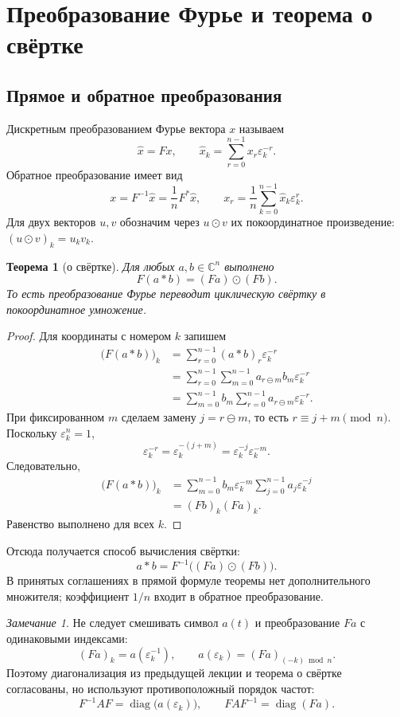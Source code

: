 \documentclass[12pt,a4paper]{article}
\newtheorem{theorem}{Теорема}
\theoremstyle{definition}
\theoremstyle{remark}
\newtheorem*{remark}{Замечание}
\DeclareMathOperator{\diag}{diag}
\newcommand{\CC}{\mathbb{C}}
\newcommand{\eps}{\varepsilon}
\begin{document}
\section{Преобразование Фурье и теорема о свёртке}

\subsection{Прямое и обратное преобразования}

Дискретным преобразованием Фурье вектора $x$ называем
\[
  \widehat x=Fx,\qquad
  \widehat x_k=\sum_{r=0}^{n-1}x_r\eps_k^{-r}.
\]
Обратное преобразование имеет вид
\[
  x=F^{-1}\widehat x=\frac1nF^*\widehat x,\qquad
  x_r=\frac1n\sum_{k=0}^{n-1}\widehat x_k\eps_k^r.
\]
Для двух векторов $u,v$ обозначим через $u\odot v$ их покоординатное
произведение: $(u\odot v)_k=u_kv_k$.

\begin{theorem}[о свёртке]
Для любых $a,b\in\CC^n$ выполнено
\[
  \boxed{F(a*b)=(Fa)\odot(Fb)}.
\]
То есть преобразование Фурье переводит циклическую свёртку в
покоординатное умножение.
\end{theorem}

\begin{proof}
Для координаты с номером $k$ запишем
\begin{align*}
  \bigl(F(a*b)\bigr)_k
  &=\sum_{r=0}^{n-1}(a*b)_r\eps_k^{-r}\\
  &=\sum_{r=0}^{n-1}\sum_{m=0}^{n-1}
     a_{r\ominus m}b_m\eps_k^{-r}\\
  &=\sum_{m=0}^{n-1}b_m
     \sum_{r=0}^{n-1}a_{r\ominus m}\eps_k^{-r}.
\end{align*}
При фиксированном $m$ сделаем замену $j=r\ominus m$, то есть
$r\equiv j+m\pmod n$. Поскольку $\eps_k^n=1$,
\[
  \eps_k^{-r}=\eps_k^{-(j+m)}=\eps_k^{-j}\eps_k^{-m}.
\]
Следовательно,
\begin{align*}
  \bigl(F(a*b)\bigr)_k
  &=\sum_{m=0}^{n-1}b_m\eps_k^{-m}
    \sum_{j=0}^{n-1}a_j\eps_k^{-j}\\
  &=(Fb)_k(Fa)_k.
\end{align*}
Равенство выполнено для всех $k$.
\end{proof}

Отсюда получается способ вычисления свёртки:
\[
  a*b=F^{-1}\bigl((Fa)\odot(Fb)\bigr).
\]
В принятых соглашениях в прямой формуле теоремы нет дополнительного
множителя; коэффициент $1/n$ входит в обратное преобразование.

\begin{remark}
Не следует смешивать символ $a(t)$ и преобразование $Fa$ с одинаковыми
индексами:
\[
  (Fa)_k=a(\eps_k^{-1}),\qquad
  a(\eps_k)=(Fa)_{(-k)\bmod n}.
\]
Поэтому диагонализация из предыдущей лекции и теорема о свёртке
согласованы, но используют противоположный порядок частот:
\[
  F^{-1}AF=\diag\bigl(a(\eps_k)\bigr),\qquad
  FAF^{-1}=\diag(Fa).
\]
\end{remark}
\end{document}
